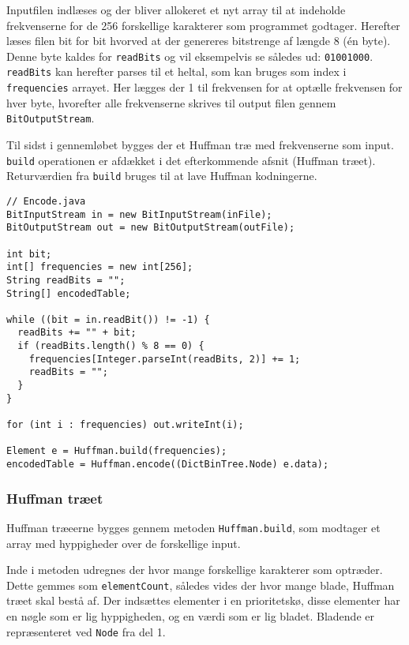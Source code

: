 \documentclass{article}
\begin{document}
Inputfilen indlæses og der bliver allokeret et nyt array til at indeholde frekvenserne for de 256 forskellige karakterer som programmet godtager. Herefter læses filen bit for bit hvorved at der genereres bitstrenge af længde 8 (én byte). Denne byte kaldes for \texttt{readBits} og vil eksempelvis se således ud: \texttt{01001000}. \texttt{readBits} kan herefter parses til et heltal, som kan bruges som index i \texttt{frequencies} arrayet. Her lægges der 1 til frekvensen for at optælle frekvensen for hver byte, hvorefter alle frekvenserne skrives til output filen gennem \texttt{BitOutputStream}.

Til sidst i gennemløbet bygges der et Huffman træ med frekvenserne som input. \texttt{build} operationen er afdækket i det efterkommende afsnit (Huffman træet).
Returværdien fra \texttt{build} bruges til at lave Huffman kodningerne.

\begin{lstlisting}
// Encode.java
BitInputStream in = new BitInputStream(inFile);
BitOutputStream out = new BitOutputStream(outFile);

int bit;
int[] frequencies = new int[256];
String readBits = "";
String[] encodedTable;

while ((bit = in.readBit()) != -1) {
  readBits += "" + bit;
  if (readBits.length() % 8 == 0) {
    frequencies[Integer.parseInt(readBits, 2)] += 1;
    readBits = "";
  }
}

for (int i : frequencies) out.writeInt(i);

Element e = Huffman.build(frequencies);
encodedTable = Huffman.encode((DictBinTree.Node) e.data);
\end{lstlisting}

\newpage
\subsubsection*{Huffman træet}
Huffman træeerne bygges gennem metoden \texttt{Huffman.build}, som modtager et array med hyppigheder over de forskellige input.

Inde i metoden udregnes der hvor mange forskellige karakterer som optræder. Dette gemmes som \texttt{elementCount}, således vides der hvor mange blade, Huffman træet skal bestå af. Der indsættes elementer i en prioritetskø, disse elementer har en nøgle som er lig hyppigheden, og en værdi som er lig bladet. Bladende er repræsenteret ved \texttt{Node} fra del 1.
\end{document}
